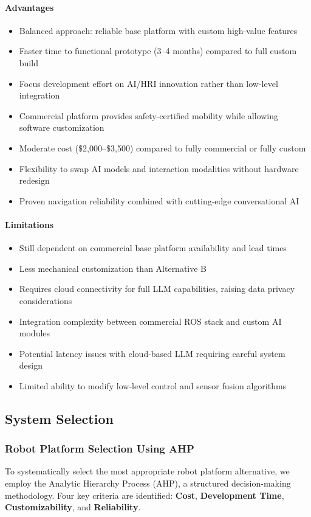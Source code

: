 \paragraph{Advantages}
\begin{itemize}
    \item Balanced approach: reliable base platform with custom high-value features
    \item Faster time to functional prototype (3--4 months) compared to full custom build
    \item Focus development effort on AI/HRI innovation rather than low-level integration
    \item Commercial platform provides safety-certified mobility while allowing software customization
    \item Moderate cost (\$2,000--\$3,500) compared to fully commercial or fully custom
    \item Flexibility to swap AI models and interaction modalities without hardware redesign
    \item Proven navigation reliability combined with cutting-edge conversational AI
\end{itemize}

\paragraph{Limitations}
\begin{itemize}
    \item Still dependent on commercial base platform availability and lead times
    \item Less mechanical customization than Alternative B
    \item Requires cloud connectivity for full LLM capabilities, raising data privacy considerations
    \item Integration complexity between commercial ROS stack and custom AI modules
    \item Potential latency issues with cloud-based LLM requiring careful system design
    \item Limited ability to modify low-level control and sensor fusion algorithms
\end{itemize}

\subsection{System Selection}

\subsubsection{Robot Platform Selection Using AHP}
To systematically select the most appropriate robot platform alternative, we employ the Analytic Hierarchy Process (AHP), a structured decision-making methodology. Four key criteria are identified: \textbf{Cost}, \textbf{Development Time}, \textbf{Customizability}, and \textbf{Reliability}.


